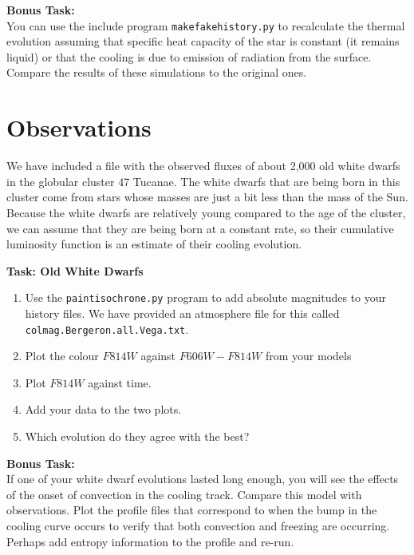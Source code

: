 \documentclass{article}
\begin{document}

\textbf{Bonus Task:}\\
You can use the include program \texttt{makefakehistory.py} to recalculate the thermal evolution assuming that specific heat capacity of the star is constant (it remains liquid) or that the cooling is due to emission of radiation from the surface.  Compare the results of these simulations to the original ones.

\section{Observations}

We have included a file with the observed fluxes of about 2,000 old white dwarfs in the globular cluster 47 Tucanae.  The white dwarfs that are being born in this cluster come from stars whose masses are just a bit less than the mass of the Sun.   Because the white dwarfs are relatively young compared to the age of the cluster, we can assume that they are being born at a constant rate, so their cumulative luminosity function is an estimate of their cooling evolution.

\textbf{Task: Old White Dwarfs}\vspace{-1em}
\begin{enumerate}
 \setlength\itemsep{0em}
\item Use the \texttt{paintisochrone.py} program to add absolute magnitudes to your history files.  We have provided an atmosphere file for this called \texttt{colmag.Bergeron.all.Vega.txt}.
\item Plot the colour $F814W$ against $F606W-F814W$ from your models
\item Plot $F814W$ against time.
\item Add your data to the two plots.  
\item Which evolution do they agree with the best?
\end{enumerate}

\textbf{Bonus Task:}\\
If one of your white dwarf evolutions lasted long enough, you will see the effects of the onset of convection in the cooling track.  Compare this model with observations.   Plot the profile files that correspond to when the bump in the cooling curve occurs to verify that both convection and freezing are occurring.   Perhaps add entropy information to the profile and re-run. 
\end{document}
